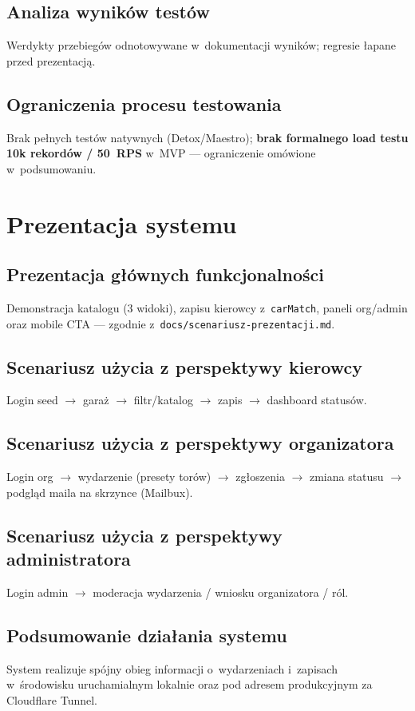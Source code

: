 \documentclass{sprz}
\begin{document}
\section{Analiza wyników testów}  
Werdykty przebiegów odnotowywane w~dokumentacji wyników; regresie łapane przed prezentacją.  
\section{Ograniczenia procesu testowania}  
Brak pełnych testów natywnych (Detox/Maestro); \textbf{brak formalnego load testu 10k rekordów / 50~RPS} w~MVP --- ograniczenie omówione w~podsumowaniu.  
  
\chapter{Prezentacja systemu}  
\section{Prezentacja głównych funkcjonalności}  
Demonstracja katalogu (3 widoki), zapisu kierowcy z~\texttt{carMatch}, paneli org/admin oraz mobile CTA --- zgodnie z~\texttt{docs/scenariusz-prezentacji.md}.  
\section{Scenariusz użycia z perspektywy kierowcy}  
Login seed $\rightarrow$ garaż $\rightarrow$ filtr/katalog $\rightarrow$ zapis $\rightarrow$ dashboard statusów.  
\section{Scenariusz użycia z perspektywy organizatora}  
Login org $\rightarrow$ wydarzenie (presety torów) $\rightarrow$ zgłoszenia $\rightarrow$ zmiana statusu $\rightarrow$ podgląd maila na skrzynce (Mailbux).  
\section{Scenariusz użycia z perspektywy administratora}  
Login admin $\rightarrow$ moderacja wydarzenia / wniosku organizatora / ról.  
\section{Podsumowanie działania systemu}  
System realizuje spójny obieg informacji o~wydarzeniach i~zapisach w~środowisku uruchamialnym lokalnie oraz pod adresem produkcyjnym za Cloudflare Tunnel.  
  
\end{document}

